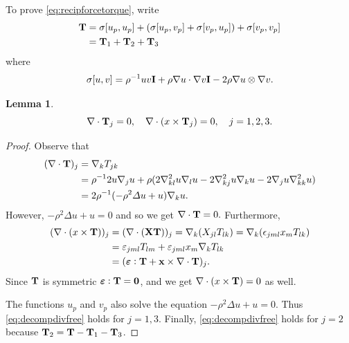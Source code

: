 \documentclass[lineno]{jfm}
\newtheorem{lemma}{Lemma}
\begin{document}
To prove \eqref{eq:recipforcetorque}, write
\begin{align*}
  {\bf T}
  &=
  \sigma[u_p,u_p]
  +(\sigma[u_p,v_p]
  +\sigma[v_p,u_p])
  +\sigma[v_p,v_p] \\
  &= {\bf T}_1 + {\bf T}_2 + {\bf T}_3
\end{align*}
where
\[
\sigma[u,v]
= \rho^{-1} uv {\bf I} + \rho \nabla u \cdot \nabla v {\bf I} - 2 \rho \nabla u \otimes \nabla v.
\]
\begin{lemma}
  \label{eq:stress_div_lemma}
  \begin{equation}
    \label{eq:decompdivfree}
    \nabla \cdot {\bf T}_j = 0, \quad
    \nabla \cdot (x \times {\bf T}_j) = 0,\quad j = 1, 2, 3.
  \end{equation}
\end{lemma}
\begin{proof}
  Observe that
  \begin{align*}
    (\nabla \cdot {\bf T})_j &=
    \nabla_k   T_{jk} \\
    &= \rho^{-1} 2u \nabla_j u + \rho(2\nabla_{kl}^2 u \nabla_l u  - 2 \nabla_{kj}^2 u \nabla_k u
    - 2 \nabla_j u \nabla_{kk}^2 u )\\
    &=2\rho^{-1}(-\rho^2 \Delta u + u)\nabla_k u .
  \end{align*}
  However, $-\rho^2 \Delta u + u = 0$ and so we get $\nabla \cdot {\bf T} = 0.$
  Furthermore,
  \begin{align*}
    (\nabla \cdot (x\times {\bf T} ))_j
    &= (\nabla \cdot ({\bf X} {\bf T} ))_j
    = \nabla_k (X_{jl} T_{lk})
    = \nabla_k (\epsilon_{jml}x_m T_{lk})\\
    &= \varepsilon_{jml} T_{lm} + \varepsilon_{jml}x_m \nabla_k T_{lk}\\
    &= (\boldsymbol{\varepsilon}:{\bf T} + {\bf x} \times \nabla \cdot {\bf T})_j.
  \end{align*}
  Since ${\bf T}$ is symmetric $\boldsymbol{\varepsilon}:{\bf T} = {\bf 0}$, and we get
  $\nabla \cdot (x \times {\bf T}) = 0$ as well.

  The functions $u_p$ and $v_p$ also solve the equation $-\rho^2 \Delta u + u = 0$.  Thus
  \eqref{eq:decompdivfree} holds for $j = 1, 3$. Finally,
  \eqref{eq:decompdivfree} holds for $j = 2$ because
  ${\bf T}_2 = {\bf T} - {\bf T}_1 - {\bf T}_3$.
\end{proof}
\end{document}

